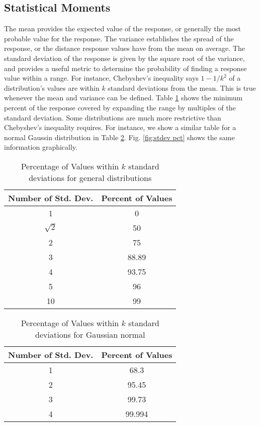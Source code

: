 \subsection{Statistical Moments}
The mean provides the expected value of the response, or generally the most probable
value for the response.  The variance establishes the spread of the response, or the distance response values
have from the mean on average.  The standard deviation of the response is given by the square root of the
variance, and provides a useful metric to determine the probability of finding a response value within a
range.  For instance, Chebyshev's inequality \cite{chebyshevineq} says $1-1/k^2$ of a distribution's values
are within $k$ standard deviations from the mean.  This is true whenever the mean and variance can be
defined.  Table
\ref{tab:cheby stdev} shows the minimum percent of the response covered by expanding the range by multiples of the
standard deviation.
Some distributions are much more restrictive than Chebyshev's inequality requires.  For instance, we 
show a similar table for a normal Gaussin distribution in Table \ref{tab:norm stdev}.  Fig. \ref{fig:stdev pct}
shows the same information graphically.
\begin{table}[htb]
  \centering
  \begin{tabular}{c c}
  Number of Std. Dev. & Percent of Values \\ \hline
  1 & 0 \\
  $\sqrt{2}$ & 50 \\
  2 & 75 \\
  3 & 88.89 \\
  4 & 93.75 \\
  5 & 96 \\
  10 & 99
  \end{tabular}
  \caption{Percentage of Values within $k$ standard deviations for general distributions}
  \label{tab:cheby stdev}
\end{table}
\begin{table}[htb]
  \centering
  \begin{tabular}{c c}
  Number of Std. Dev. & Percent of Values \\ \hline
  1 & 68.3 \\
  2 & 95.45 \\
  3 & 99.73 \\
  4 & 99.994 \\
  \end{tabular}
  \caption{Percentage of Values within $k$ standard deviations for Gaussian normal}
  \label{tab:norm stdev}
\end{table}

